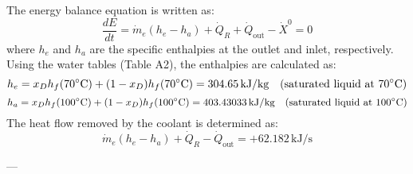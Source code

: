 The energy balance equation is written as:  
\[
\frac{dE}{dt} = \dot{m}_e (h_e - h_a) + \dot{Q}_R + \dot{Q}_{\text{out}} - \dot{X}^0 = 0
\]  
where \( h_e \) and \( h_a \) are the specific enthalpies at the outlet and inlet, respectively. Using the water tables (Table A2), the enthalpies are calculated as:  
\[
h_e = x_D h_f(70^\circ\text{C}) + (1 - x_D) h_f(70^\circ\text{C}) = 304.65 \, \text{kJ/kg} \quad \text{(saturated liquid at \( 70^\circ\text{C} \))}
\]  
\[
h_a = x_D h_f(100^\circ\text{C}) + (1 - x_D) h_f(100^\circ\text{C}) = 403.43033 \, \text{kJ/kg} \quad \text{(saturated liquid at \( 100^\circ\text{C} \))}
\]  
The heat flow removed by the coolant is determined as:  
\[
\dot{m}_e (h_e - h_a) + \dot{Q}_R - \dot{Q}_{\text{out}} = +62.182 \, \text{kJ/s}
\]  

---
